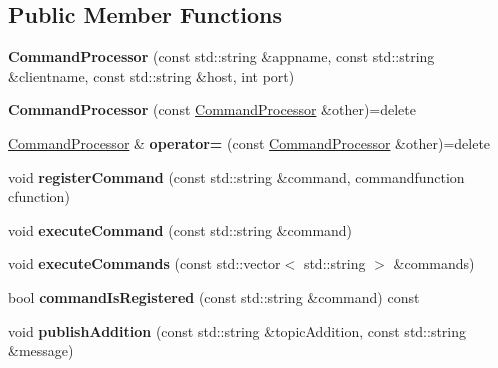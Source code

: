 \subsection*{Public Member Functions}
\begin{DoxyCompactItemize}
\item 
\mbox{\label{class_command_processor_a053c5d39a7c42ddaeeab11467a052e98}} 
{\bfseries Command\+Processor} (const std\+::string \&appname, const std\+::string \&clientname, const std\+::string \&host, int port)
\item 
\mbox{\label{class_command_processor_ad3ed59d0f22d979f2010a541a08c1ee3}} 
{\bfseries Command\+Processor} (const \mbox{\hyperlink{class_command_processor}{Command\+Processor}} \&other)=delete
\item 
\mbox{\label{class_command_processor_a1068633e1f6af69a67de06f10d8dba3a}} 
\mbox{\hyperlink{class_command_processor}{Command\+Processor}} \& {\bfseries operator=} (const \mbox{\hyperlink{class_command_processor}{Command\+Processor}} \&other)=delete
\item 
\mbox{\label{class_command_processor_a72e15bc0082d628bd05aacedd5aa7ee0}} 
void {\bfseries register\+Command} (const std\+::string \&command, commandfunction cfunction)
\item 
\mbox{\label{class_command_processor_a3a830f1939e458f31f0cd2d42855609f}} 
void {\bfseries execute\+Command} (const std\+::string \&command)
\item 
\mbox{\label{class_command_processor_a9c23c88fe12e643092993a8bb2aa0528}} 
void {\bfseries execute\+Commands} (const std\+::vector$<$ std\+::string $>$ \&commands)
\item 
\mbox{\label{class_command_processor_aedf8ed63942b334bdef3d017a7892f34}} 
bool {\bfseries command\+Is\+Registered} (const std\+::string \&command) const
\item 
\mbox{\label{class_command_processor_a88ad204c02a79887698c6abc93729a2d}} 
void {\bfseries publish\+Addition} (const std\+::string \&topic\+Addition, const std\+::string \&message)

\end{DoxyCompactItemize}
